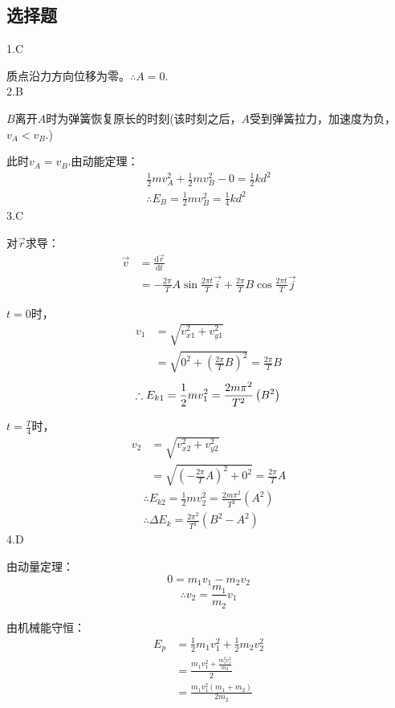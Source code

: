 \documentclass[blue, normal]{./templete/qyxfnote}
\newcommand{\di}[1]{\mathrm{d}#1}
\begin{document}
\begin{multicols}{2}
	\subsection{选择题}
	\noindent
	1.C\par
	质点沿力方向位移为零。$\therefore A=0$.\\
	2.B\par
	$B$离开$A$时为弹簧恢复原长的时刻(该时刻之后，$A$受到弹簧拉力，加速度为负，$v_A<v_B$.)\par
	此时$v_A=v_B$.由动能定理：
	\begin{align*}
	\frac{1}{2}mv_A^2+\frac{1}{2}mv_B^2-0=\frac{1}{2}kd^2\\
	\therefore{}E_B=\frac{1}{2}mv_B^2=\frac{1}{4}kd^2
	\end{align*}
	3.C\par
	对$\vec{r}$求导：
	\begin{align*}
	\vec{v}&=\frac{\di{\vec{r}}}{\di{t}}\\
	&=-\frac{2\pi}{T}A\sin\frac{2\pi t}{T}\vec{i}+\frac{2\pi}{T}B\cos\frac{2\pi t}{T}\vec{j}
	\end{align*}
	\par$t=0$时，
	\begin{align*}
	v_1&=\sqrt{v_{x1}^2+v_{y1}^2}\\
	&=\sqrt{0^2+\left(\frac{2\pi}{T}B\right)^2}=\frac{2\pi}{T}B
	\end{align*}
	\[\therefore{}E_{k1}=\frac{1}{2}mv_1^2=\frac{2m\pi^2}{T^2}\left(B^2\right)\\\]
	\par$t=\frac{T}{4}$时，
	\begin{align*}
	v_2&=\sqrt{v_{x2}^2+v_{y2}^2}\\
	&=\sqrt{\left(-\frac{2\pi}{T}A\right)^2+0^2}=\frac{2\pi}{T}A
	\end{align*}
	\begin{gather*}
	\therefore{}E_{k2}=\frac{1}{2}mv_2^2=\frac{2m\pi^2}{T^2}\left(A^2\right)\\
	\therefore\Delta{}E_k=\frac{2\pi^2}{T^2}(B^2-A^2)
	\end{gather*}
	4.D\par
	由动量定理：
	\[0=m_1v_1-m_2v_2\]
	\[\therefore{}v_2=\frac{m_1}{m_2}v_1\]\par
	由机械能守恒：
	\begin{align*}
	E_p &=\frac{1}{2}m_1v_1^2+\frac{1}{2}m_2v_2^2\\
	&=\frac{m_1v_1^2+\frac{m_1^2v_1^2}{m_2}}{2}\\
	&=\frac{m_1v_1^2\left(m_1+m_2\right)}{2m_2}

\end{align*}
\end{multicols}
\end{document}
